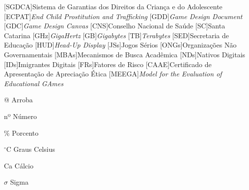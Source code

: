 \begin{siglas}
\begin{acronym}[labelsep=1.5cm]
		[SGDCA]{{Sistema de Garantias dos Direitos da Criança e do Adolescente}}
		[ECPAT]{\textit{End Child Prostitution and Trafficking}}
		[GDD]{\textit{Game Design Document}}
		[GDC]{\textit{Game Design Canvas}}
		[CNS]{{Conselho Nacional de Saúde}}
		[SC]{{Santa Catarina}}
		[GHz]{\textit{GigaHertz}}
		[GB]{\textit{Gigabytes}}
		[TB]{\textit{Terabytes}}
		[SED]{{Secretaria de Educação}}
		[HUD]{\textit{Head-Up Display}}
		[JSs]{Jogos Sérios}
		{Organizações Não Governamentais}
		{{Mecanismos de Busca Acadêmica}}
		[NDs]{{Nativos Digitais}}
		[IDs]{{Imigrantes Digitais}}
		[FRs]{{Fatores de Risco}}
		{{Certificado de Apresentação de Apreciação Ética}}
		[MEEGA]{\textit{Model for the Evaluation of Educational GAmes}}

	\end{acronym}
\end{siglas}






\begin{simbolos}
  \item[@] Arroba
  \item[nº] Número
  \item[\%] Porcento
  \item[$^\circ$C] Graus Celsius
  \item[Ca] Cálcio
  \item[$\sigma$] Sigma
\end{simbolos}

